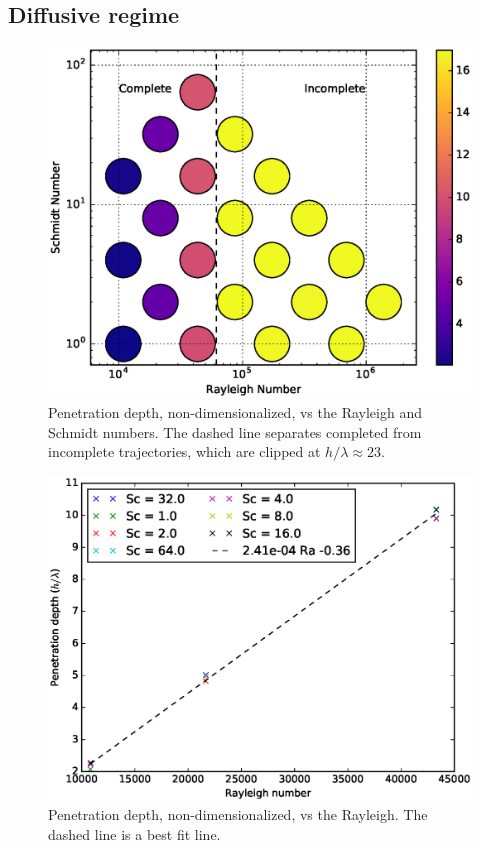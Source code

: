 \subsection{Diffusive regime}
\begin{figure}
\includegraphics[width=\columnwidth]{figs/PenetrationDepth-vs-Rayleigh-Schmidt}
\caption{ 
  Penetration depth, non-dimensionalized, vs the Rayleigh and Schmidt numbers.
  The dashed line separates completed from incomplete trajectories, which are clipped at $h/\lambda \approx 23$.
}
\end{figure}

\begin{figure}
\includegraphics[width=\columnwidth]{figs/Depth-vs-Rayleigh}
\caption{ 
  Penetration depth, non-dimensionalized, vs the Rayleigh.
  The dashed line is a best fit line.
}
\end{figure}

